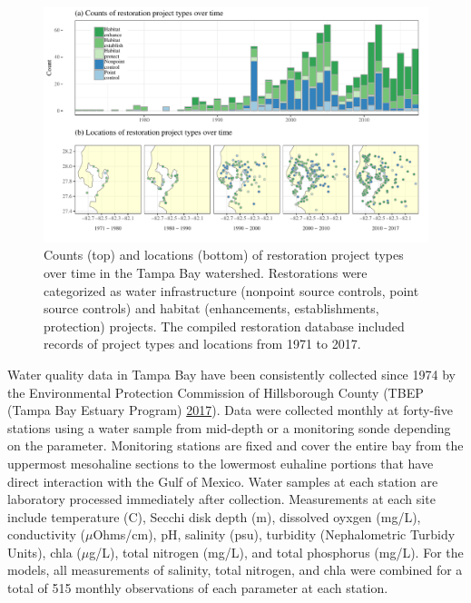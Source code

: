 \documentclass[]{article}
\begin{document}
\begin{figure}
\centerline{\includegraphics[width = \textwidth]{figs/restyrs.pdf}}
\caption{Counts (top) and locations (bottom) of restoration project types over time in the Tampa Bay watershed.  Restorations were categorized as water infrastructure (nonpoint source controls, point source controls) and habitat (enhancements, establishments, protection) projects.  The compiled restoration database included records of project types and locations from 1971 to 2017.}
\label{fig:restyrs}
\end{figure}

Water quality data in Tampa Bay have been consistently collected since
1974 by the Environmental Protection Commission of Hillsborough County
(TBEP (Tampa Bay Estuary Program) \protect\hyperlink{ref-TBEP17}{2017}).
Data were collected monthly at forty-five stations using a water sample
from mid-depth or a monitoring sonde depending on the parameter.
Monitoring stations are fixed and cover the entire bay from the
uppermost mesohaline sections to the lowermost euhaline portions that
have direct interaction with the Gulf of Mexico. Water samples at each
station are laboratory processed immediately after collection.
Measurements at each site include temperature (C), Secchi disk depth
(m), dissolved oyxgen (mg/L), conductivity (\(\mu\)Ohms/cm), pH,
salinity (psu), turbidity (Nephalometric Turbidy Units), \ac{chla}
(\(\mu\)g/L), total nitrogen (mg/L), and total phosphorus (mg/L). For
the models, all measurements of salinity, total nitrogen, and \ac{chla}
were combined for a total of 515 monthly observations of each parameter
at each station.
\end{document}
